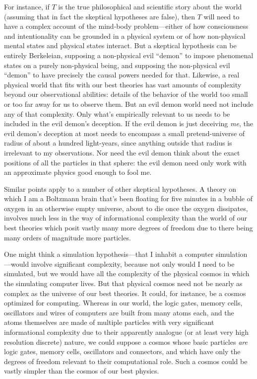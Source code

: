 For instance, if $T$ is the true philosophical and scientific story about the world (assuming that in fact
the skeptical hypotheses are false), then $T$ will need to have a complex account of the mind-body problem---either 
of how consciousness and intentionality can be grounded in a physical system or of how non-physical mental states 
and physical states interact. But a skeptical hypothesis can be entirely
Berkeleian, supposing a non-physical evil ``demon'' to impose phenomenal states on a purely non-physical being, and supposing
the non-physical evil ``demon'' to have precisely the causal powers needed for that. Likewise, 
a real physical world that fits with our best theories has vast amounts of complexity beyond our observational
abilities: details of the behavior of the world too small or too far away for us to observe them. But an 
evil demon world need not include any of that complexity. Only what's empirically relevant to us needs to be included 
in the evil demon's deception. If the evil demon is just deceiving \textit{me}, the evil demon's deception at most 
needs to encompass a small pretend-universe of radius of about a hundred light-years, since anything outside that radius is
irrelevant to my observations. Nor need the evil demon think about the exact positions of all the particles in that sphere:
the evil demon need only work with an approximate physics good enough to fool me. 

Similar points apply to a number of other skeptical hypotheses. A theory on which I am a Boltzmann brain that's been 
floating for five minutes in a bubble of oxygen in an otherwise empty universe, about to die once the oxygen
dissipates, involves much less in the way of informational complexity than the world of our best theories which posit
vastly many more degrees of freedom due to there being many orders of magnitude more particles.

One might think a simulation hypothesis---that I inhabit a computer simulation---would involve significant complexity,
because not only would I need to be simulated, but we would have all the complexity of the physical cosmos in which the
simulating computer lives. But that physical cosmos need not be nearly as complex as the universe of our best theories.
It could, for instance, be a cosmos optimized for computing. Whereas in our world, the logic gates, memory cells, 
oscillators and wires of computers are built from many atoms each, and the atoms themselves
are made of multiple particles with very significant informational complexity due to their apparently analogue (or at least
very high resolution discrete) nature, we could suppose a cosmos whose basic particles \textit{are} logic gates, memory
cells, oscillators and connectors, and which have only the degrees of freedom relevant to their computational role. Such a 
cosmos could be vastly simpler than the cosmos of our best physics. 

